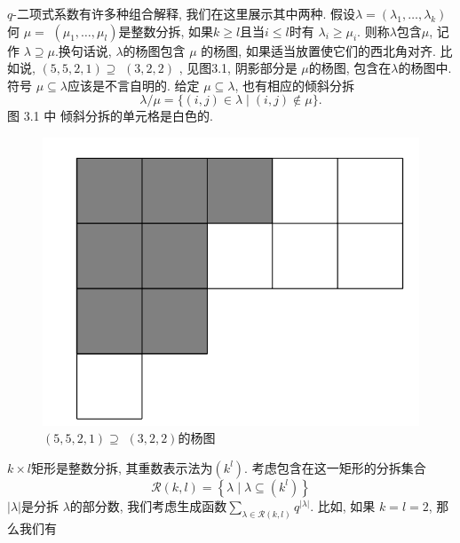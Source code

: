 \documentclass[a4paper,12pt]{ctexbook}
\begin{document}
 $q$-二项式系数有许多种组合解释, 我们在这里展示其中两种. 假设$\lambda=\left(\lambda_{1}, \ldots, \lambda_{k}\right)$ 何 $\mu=$ $\left(\mu_{1}, \ldots, \mu_{l}\right)$是整数分拆, 如果$k \geq l$且当$i \leq l$时有 $\lambda_{i} \geq \mu_{i}$. 则称$\lambda$包含$\mu$, 记作 $\lambda \supseteq \mu$.换句话说, $\lambda$的杨图包含 $\mu$ 的杨图, 如果适当放置使它们的西北角对齐. 比如说,  $(5,5,2,1) \supseteq$ $(3,2,2)$ , 见图3.1, 阴影部分是 $\mu$的杨图, 包含在$\lambda$的杨图中. 符号 $\mu \subseteq \lambda$应该是不言自明的. 给定 $\mu \subseteq \lambda$, 也有相应的{\kaishu 倾斜分拆}
\[
\lambda / \mu=\{(i, j) \in \lambda \mid(i, j) \notin \mu\} .\tag{3.7}
\]
图 3.1 中 倾斜分拆的单元格是白色的.
\begin{figure}[h]
	\centering
	\includegraphics[width=0.5\linewidth]{./fig3/3-1.png}
	\caption{\label{chapter} $(5,5,2,1) \supseteq$ $(3,2,2)$的杨图}
\end{figure}

 $k \times l$矩形是整数分拆, 其重数表示法为$\left(k^{l}\right) $. 考虑包含在这一矩形的分拆集合
$$
\mathcal{R}(k, l)=\left\{\lambda \mid \lambda \subseteq\left(k^{l}\right)\right\}
$$
 $|\lambda|$是分拆 $\lambda$的部分数, 我们考虑生成函数$\sum_{\lambda \in \mathcal{R}(k, l)} q^{|\lambda|} $. 比如, 如果  $k=l=2$, 那么我们有
\end{document}
